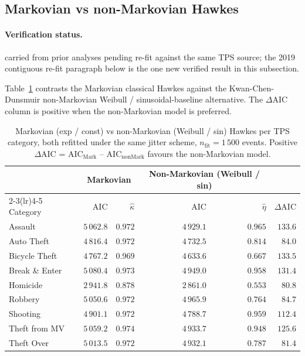 \documentclass[article,shortnames,nojss]{jss}
\begin{document}
\subsection{Markovian vs non-Markovian Hawkes}\label{phys-markov-nonmarkov}


\paragraph*{Verification status.}
carried from prior analyses pending re-fit against the same TPS source; the 2019 contiguous re-fit paragraph below is the one new verified result in this subsection.

Table~\ref{tab:hawkes-mvsnm} contrasts the Markovian classical
Hawkes against the Kwan-Chen-Dunsmuir non-Markovian Weibull /
sinusoidal-baseline alternative.  The $\Delta\mathrm{AIC}$ column
is positive when the non-Markovian model is preferred.

\begin{table}[h]
\centering\small
\caption{Markovian (exp / const) vs non-Markovian (Weibull / sin)
Hawkes per TPS category, both refitted under the same jitter
scheme, $n_{\mathrm{fit}} = 1\,500$ events.  Positive
$\Delta\mathrm{AIC}$ = AIC$_{\text{Mark}}$ -- AIC$_{\text{nonMark}}$
favours the non-Markovian model.}\label{tab:hawkes-mvsnm}
\begin{tabular}{lrrrrr}
\toprule
& \multicolumn{2}{c}{Markovian} &
   \multicolumn{2}{c}{Non-Markovian (Weibull / sin)} & \\
\cmidrule(lr){2-3}\cmidrule(lr){4-5}
Category & AIC & $\hat\kappa$ & AIC & $\hat\eta$ & $\Delta\mathrm{AIC}$\\\midrule
Assault       & $5\,062.8$ & $0.972$ & $4\,929.1$ & $0.965$ & $133.6$\\
Auto Theft    & $4\,816.4$ & $0.972$ & $4\,732.5$ & $0.814$ & $\phantom{0}84.0$\\
Bicycle Theft & $4\,767.2$ & $0.969$ & $4\,633.6$ & $0.667$ & $133.5$\\
Break \& Enter& $5\,080.4$ & $0.973$ & $4\,949.0$ & $0.958$ & $131.4$\\
Homicide      & $2\,941.8$ & $0.878$ & $2\,861.0$ & $0.553$ & $\phantom{0}80.8$\\
Robbery       & $5\,050.6$ & $0.972$ & $4\,965.9$ & $0.764$ & $\phantom{0}84.7$\\
Shooting      & $4\,901.1$ & $0.972$ & $4\,788.7$ & $0.959$ & $112.4$\\
Theft from MV & $5\,059.2$ & $0.974$ & $4\,933.7$ & $0.948$ & $125.6$\\
Theft Over    & $5\,013.5$ & $0.972$ & $4\,932.1$ & $0.787$ & $\phantom{0}81.4$\\
\bottomrule
\end{tabular}
\end{table}
\end{document}
